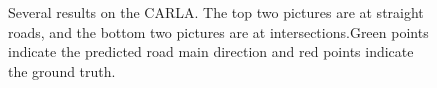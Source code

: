 \documentclass[letterpaper,10 pt,conference]{ieeeconf}  %
\begin{document}
\begin{figure}[]
{    }
    \quad
    \quad
    \caption{Several results on the CARLA. The top two pictures are at straight roads, and the bottom two pictures are at intersections.Green points indicate the predicted road main direction and red points indicate the ground truth.}
    \label{withmap}
\end{figure}
\end{document}
